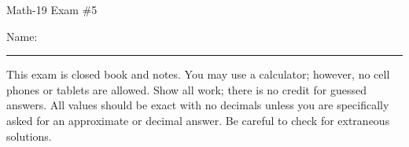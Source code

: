 \documentclass[letterpaper,12pt,fleqn]{article}
\begin{document}
\begin{center}
\Large Math-19 Exam \#5
\end{center}

\vspace{0.5in}

Name: \rule{4in}{1pt}

\vspace{0.5in}

This exam is closed book and notes. You may use a calculator; however, no cell
phones or tablets are allowed. Show all work; there is no credit for guessed
answers. All values should be exact with no decimals unless you are
specifically asked for an approximate or decimal answer. Be careful to check
for extraneous solutions.

\vspace{0.5in}

\begin{center}
\end{center}

\newpage
\end{document}
